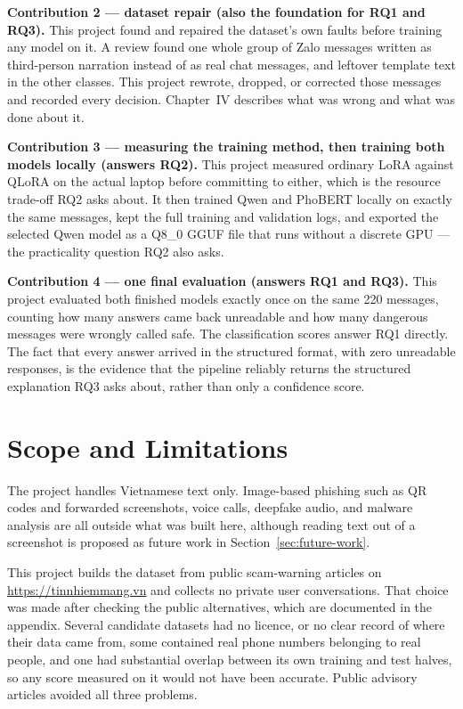 \textbf{Contribution 2 --- dataset repair (also the foundation for RQ1 and RQ3).} This project found and repaired the dataset's own faults before training any model on it. A review found one whole group of Zalo messages written as third-person narration instead of as real chat messages, and leftover template text in the other classes. This project rewrote, dropped, or corrected those messages and recorded every decision. Chapter~IV describes what was wrong and what was done about it.

\textbf{Contribution 3 --- measuring the training method, then training both models locally (answers RQ2).} This project measured ordinary LoRA against QLoRA on the actual laptop before committing to either, which is the resource trade-off RQ2 asks about. It then trained Qwen and PhoBERT locally on exactly the same messages, kept the full training and validation logs, and exported the selected Qwen model as a Q8\_0 GGUF file that runs without a discrete GPU --- the practicality question RQ2 also asks.

\textbf{Contribution 4 --- one final evaluation (answers RQ1 and RQ3).} This project evaluated both finished models exactly once on the same 220 messages, counting how many answers came back unreadable and how many dangerous messages were wrongly called safe. The classification scores answer RQ1 directly. The fact that every answer arrived in the structured format, with zero unreadable responses, is the evidence that the pipeline reliably returns the structured explanation RQ3 asks about, rather than only a confidence score.

\section{Scope and Limitations}
The project handles Vietnamese text only. Image-based phishing such as QR codes and forwarded screenshots, voice calls, deepfake audio, and malware analysis are all outside what was built here, although reading text out of a screenshot is proposed as future work in Section~\ref{sec:future-work}.

This project builds the dataset from public scam-warning articles on \url{https://tinnhiemmang.vn} and collects no private user conversations. That choice was made after checking the public alternatives, which are documented in the appendix. Several candidate datasets had no licence, or no clear record of where their data came from, some contained real phone numbers belonging to real people, and one had substantial overlap between its own training and test halves, so any score measured on it would not have been accurate. Public advisory articles avoided all three problems.

